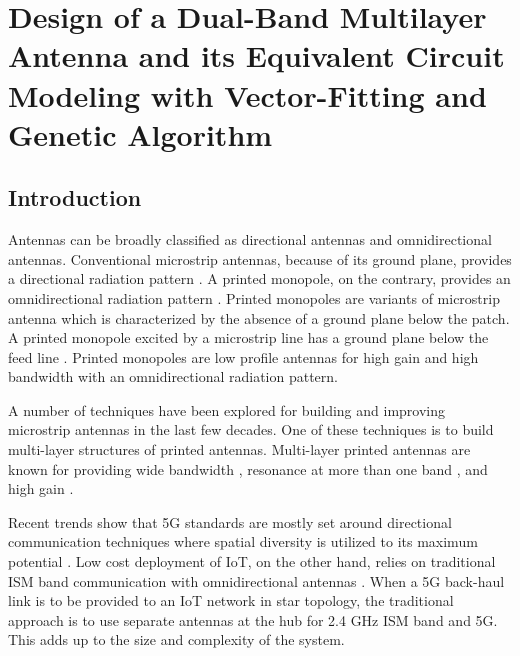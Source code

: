 \chapter{Design of a Dual-Band Multilayer Antenna and its Equivalent Circuit Modeling with Vector-Fitting and Genetic Algorithm}
\label{chap:chap4}
\section{Introduction}\label{c4sec:intro}
Antennas can be broadly classified as directional antennas and omnidirectional antennas. Conventional microstrip antennas, because of its ground plane, provides a directional radiation pattern \cite{handbook}. A printed monopole, on the contrary, provides an omnidirectional radiation pattern \cite{pma_stripline, pma_dualband}. Printed monopoles are variants of microstrip antenna which is characterized by the absence of a ground plane below the patch. A printed monopole excited by a microstrip line has a ground plane below the feed line \cite{pma_stripline}. Printed monopoles are low profile antennas for high gain and high bandwidth with an omnidirectional radiation pattern\cite{PMA01}.

A number of techniques have been explored for building and improving microstrip antennas in the last few decades. One of these techniques is to build multi-layer structures of printed antennas. Multi-layer printed antennas are known for providing wide bandwidth \cite{ML_WideBand01}, resonance at more than one band \cite{ML_DualBand01, ML_DualBand02}, and high gain \cite{ML_high_gain_parasitic_slot}.

Recent trends show that 5G standards are mostly set around directional communication techniques where spatial diversity is utilized to its maximum potential \cite{5G_surv1, 5G_surv2}. Low cost deployment of IoT, on the other hand, relies on traditional ISM band communication with omnidirectional antennas \cite{iot-ant1,iot-ant2,iot-ant3}. When a 5G back-haul link is to be provided to an IoT network in star topology, the traditional approach is to use separate antennas at the hub for 2.4 GHz ISM band and 5G. This adds up to the size and complexity of the system.

